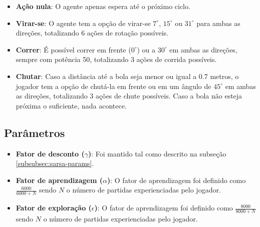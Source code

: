 \begin{itemize}
	\item \textbf{Ação nula}: O agente apenas espera até o próximo ciclo.
	
	\item \textbf{Virar-se}: O agente tem a opção de virar-se $7^{\circ}$, $15^{\circ}$ ou $31^{\circ}$ para ambas as direções, totalizando 6 ações de rotação possíveis. 
	
	\item \textbf{Correr}: É possível correr em frente ($0^{\circ}$) ou a $30^{\circ}$ em ambas as direções, sempre com potência 50, totalizando 3 ações de corrida possíveis.
	
	\item \textbf{Chutar}: Caso a distância até a bola seja menor ou igual a 0.7 metros, o jogador tem a opção de chutá-la em frente ou em um ângulo de $45^{\circ}$ em ambas as direções, totalizando 3 ações de chute possíveis. Caso a bola não esteja próxima o suficiente, nada acontece.
\end{itemize}

\subsection{Parâmetros}
\label{subsubsec:tabular-params}

\begin{itemize}
	\item \textbf{Fator de desconto ($\gamma$)}: Foi mantido tal como descrito na subseção \ref{subsubsec:sarsa-params}.
	
	\item \textbf{Fator de aprendizagem ($\alpha$)}: O fator de aprendizagem foi definido como $\frac{6000}{6000+N}$ sendo $N$ o número de partidas experienciadas pelo jogador. 
	
	\item \textbf{Fator de exploração ($\epsilon$)}: O fator de aprendizagem foi definido como $\frac{8000}{8000+N}$ sendo $N$ o número de partidas experienciadas pelo jogador. 
\end{itemize}